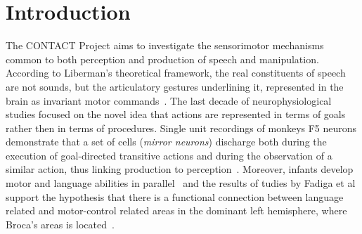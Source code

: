 \section{Introduction}
\label{ch:intro}
The CONTACT Project aims to investigate the
sensorimotor mechanisms common to both perception and production of speech and
manipulation.
%
According to Liberman's theoretical framework,
the real constituents of speech are not sounds, but the articulatory
gestures underlining it, represented in the brain as invariant motor 
commands~\citep{liberman.mattingly:1985}.
The last decade of neurophysiological studies focused on the novel idea that
actions are represented in terms of goals rather then in terms of
procedures. 
Single unit recordings of monkeys F5 neurons demonstrate that a set of cells
(\emph{mirror neurons}) discharge both during the execution of goal-directed 
transitive  actions and during the observation of a similar action, thus 
linking production to perception~\citep{rizzolatti.etal:1988,rizzolatti.etal:1996,rizzolatti.fadiga:1998}. 
Moreover, infants develop motor and language abilities in
parallel~\citep{lennenberg:1967,kandel.schwartz.jessel:2000} and the results of
tudies by Fadiga et al support
%
%
the hypothesis that there is a functional connection between language related
and motor-control related areas in the dominant left
hemisphere, where Broca's areas is located~\citep{fadiga.etal:PRESS}. 


